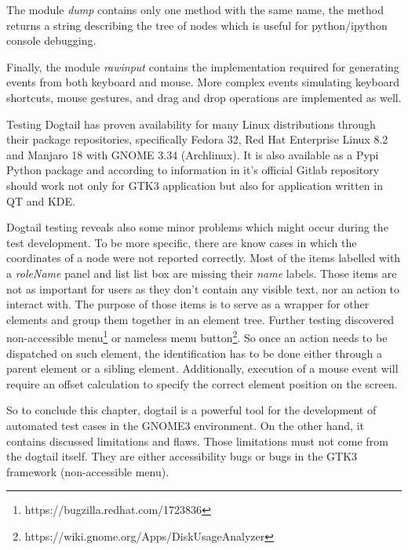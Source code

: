 The module \textit{dump} contains only one method with the same name, the method returns a string describing the tree of nodes which is useful for python/ipython console debugging.

Finally, the module \textit{rawinput} contains the implementation required for generating events from both keyboard and mouse. More complex events simulating keyboard shortcuts, mouse gestures, and drag and drop operations are implemented as well.  

 Testing Dogtail has proven availability for many Linux distributions through their package repositories, specifically Fedora 32, Red Hat Enterprise Linux 8.2 and Manjaro 18 with GNOME 3.34 (Archlinux). It is also available as a Pypi Python package and according to information in it's official Gitlab repository should work not only for GTK3 application but also for application written in QT and KDE. 
 
 Dogtail testing reveals also some minor problems which might occur during the test development. To be more specific, there are know cases in which the coordinates of a node were not reported correctly. Most of the items labelled with a \textit{roleName} panel and list list box are missing their \textit{name} labels. Those items are not as important for users as they don't contain any visible text, nor an action to interact with. The purpose of those items is to serve as a wrapper for other elements and group them together in an element tree. Further testing discovered non-accessible menu\footnote{https://bugzilla.redhat.com/1723836} or nameless menu button\footnote{https://wiki.gnome.org/Apps/DiskUsageAnalyzer}. So once an action needs to be dispatched on such element, the identification has to be done either through a parent element or a sibling element. Additionally, execution of a mouse event will require an offset calculation to specify the correct element position on the screen.
 
 So to conclude this chapter, dogtail is a powerful tool for the development of automated test cases in the GNOME3 environment. On the other hand, it contains discussed limitations and flaws. Those limitations must not come from the dogtail itself. They are either accessibility bugs or bugs in the GTK3 framework (non-accessible menu).  

